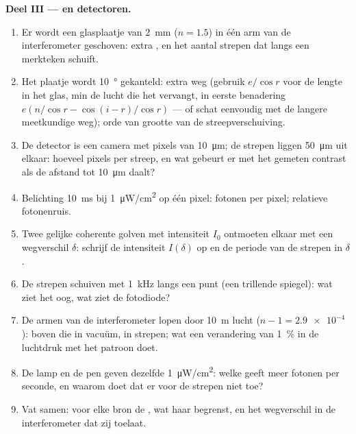 \begin{problem}
\medskip
\noindent\textbf{Deel III ---  en detectoren.}
\begin{enumerate}[resume]
  \item Er wordt een glasplaatje van \qty{2}{mm} ($n = 1.5$) in één arm van
        de interferometer geschoven: extra , en het aantal
        strepen dat langs een merkteken schuift.
  \item Het plaatje wordt \qty{10}{\degree} gekanteld: extra weg (gebruik
        $e/\cos r$ voor de lengte in het glas, min de lucht die het
        vervangt, in eerste benadering $e(n/\cos r - \cos(i - r)/\cos r)$
        --- of schat eenvoudig met de langere meetkundige weg); orde van
        grootte van de streepverschuiving.
  \item De detector is een camera met pixels van \qty{10}{\micro m}; de
        strepen liggen \qty{50}{\micro m} uit elkaar: hoeveel pixels per
        streep, en wat gebeurt er met het gemeten contrast als de afstand
        tot \qty{10}{\micro m} daalt?
  \item Belichting \qty{10}{ms} bij \qty{1}{\micro W/cm^2} op één pixel:
        fotonen per pixel; relatieve fotonenruis.
  \item Twee gelijke coherente golven met intensiteit $I_0$ ontmoeten elkaar
        met een wegverschil $\delta$: schrijf de intensiteit $I(\delta)$ op
        en de periode van de strepen in $\delta$.
  \item De strepen schuiven met \qty{1}{kHz} langs een punt (een trillende
        spiegel): wat ziet het oog, wat ziet de fotodiode?
  \item De armen van de interferometer lopen door \qty{10}{m} lucht
        ($n - 1 =
        \qty{2.9e-4}{}$):  boven die in vacuüm,
        in strepen; wat een verandering van \qty{1}{\%} in de luchtdruk met
        het patroon doet.
  \item De lamp en de pen geven dezelfde \qty{1}{\micro W/cm^2}: welke geeft
        meer fotonen per seconde, en waarom doet dat er voor de strepen niet
        toe?
  \item Vat samen: voor elke bron de , wat haar begrenst, en
        het wegverschil in de interferometer dat zij toelaat.
\end{enumerate}
\end{problem}
